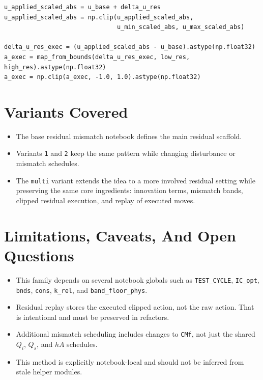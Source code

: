\documentclass[11pt]{article}
\begin{document}
\begin{lstlisting}
u_applied_scaled_abs = u_base + delta_u_res
u_applied_scaled_abs = np.clip(u_applied_scaled_abs,
                               u_min_scaled_abs, u_max_scaled_abs)

delta_u_res_exec = (u_applied_scaled_abs - u_base).astype(np.float32)
a_exec = map_from_bounds(delta_u_res_exec, low_res, high_res).astype(np.float32)
a_exec = np.clip(a_exec, -1.0, 1.0).astype(np.float32)
\end{lstlisting}

\section*{Variants Covered}

\begin{itemize}
\item The base residual mismatch notebook defines the main residual scaffold.
\item Variants \texttt{1} and \texttt{2} keep the same pattern while changing
      disturbance or mismatch schedules.
\item The \texttt{multi} variant extends the idea to a more involved residual
      setting while preserving the same core ingredients: innovation terms,
      mismatch bands, clipped residual execution, and replay of executed moves.
\end{itemize}

\section*{Limitations, Caveats, And Open Questions}

\begin{itemize}
\item This family depends on several notebook globals such as
      \texttt{TEST\_CYCLE}, \texttt{IC\_opt}, \texttt{bnds}, \texttt{cons},
      \texttt{k\_rel}, and \texttt{band\_floor\_phys}.
\item Residual replay stores the executed clipped action, not the raw action.
      That is intentional and must be preserved in refactors.
\item Additional mismatch scheduling includes changes to \texttt{CMf}, not just
      the shared $Q_i$, $Q_s$, and $hA$ schedules.
\item This method is explicitly notebook-local and should not be inferred from
      stale helper modules.
\end{itemize}
\end{document}
